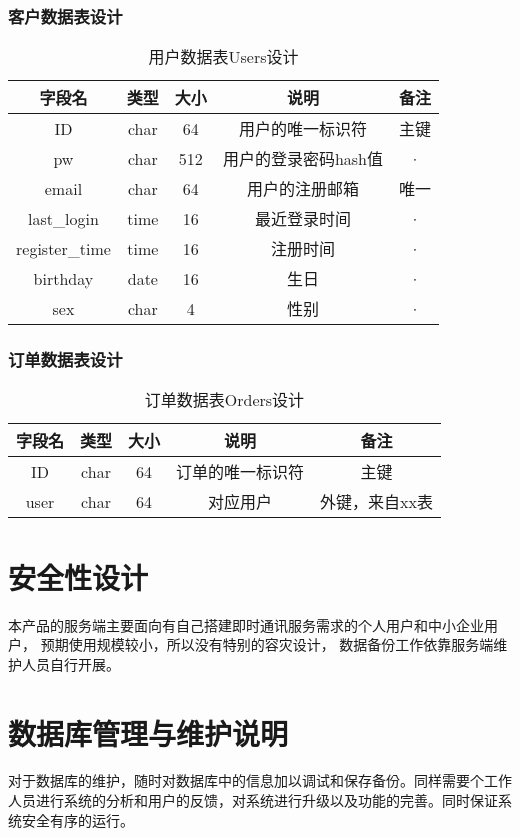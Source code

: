 \subsubsection{客户数据表设计}
\begin{table}[htbp]
\centering
\caption{用户数据表Users设计} \label{tab:client-database}
\begin{tabular}{|c|c|c|c|c|}
    \hline
    字段名 & 类型 & 大小 & 说明 & 备注 \\
    \hline
    ID & char & 64 & 用户的唯一标识符 & 主键\\
    \hline
    pw & char & 512 & 用户的登录密码hash值 & · \\
    \hline
    email & char & 64 & 用户的注册邮箱 & 唯一 \\
    \hline
    last_login & time & 16 & 最近登录时间 & · \\
    \hline
    register_time & time & 16 & 注册时间 & · \\
    \hline
    birthday & date & 16 & 生日 & · \\
    \hline
    sex & char & 4 & 性别 & · \\
    \hline
\end{tabular}
\end{table}

\subsubsection{订单数据表设计}
\begin{table}[htbp]
\centering
\caption{订单数据表Orders设计} \label{tab:order-database}
\begin{tabular}{|c|c|c|c|c|}
    \hline
    字段名 & 类型 & 大小 & 说明 & 备注 \\
    \hline
    ID & char & 64 & 订单的唯一标识符 & 主键\\
    \hline
    user & char & 64 & 对应用户 & 外键，来自xx表 \\
    \hline
\end{tabular}
\end{table}
\section{安全性设计}
本产品的服务端主要面向有自己搭建即时通讯服务需求的个人用户和中小企业用户，
预期使用规模较小，所以没有特别的容灾设计，
数据备份工作依靠服务端维护人员自行开展。

\section{数据库管理与维护说明}
对于数据库的维护，随时对数据库中的信息加以调试和保存备份。同样需要个工作人员进行系统的分析和用户的反馈，对系统进行升级以及功能的完善。同时保证系统安全有序的运行。